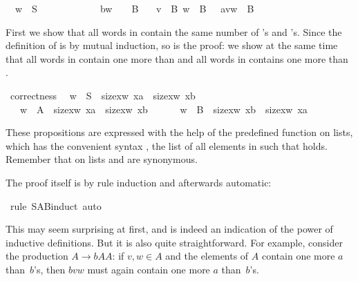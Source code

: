 \begin{isabellebody}
\isanewline
\ \ {\isachardoublequote}w\ {\isasymin}\ S\ \ \ \ \ \ \ \ \ \ \ \ {\isasymLongrightarrow}\ b{\isacharhash}w\ \ \ {\isasymin}\ B{\isachardoublequote}\isanewline
\ \ {\isachardoublequote}{\isasymlbrakk}\ v\ {\isasymin}\ B{\isacharsemicolon}\ w\ {\isasymin}\ B\ {\isasymrbrakk}\ {\isasymLongrightarrow}\ a{\isacharhash}v{\isacharat}w\ {\isasymin}\ B{\isachardoublequote}%
\begin{isamarkuptext}%
\noindent
First we show that all words in  contain the same number of 's and 's. Since the definition of  is by mutual
induction, so is the proof: we show at the same time that all words in
 contain one more  than  and all words in  contains one more  than .%
\end{isamarkuptext}%
\ correctness{\isacharcolon}\isanewline
\ \ {\isachardoublequote}{\isacharparenleft}w\ {\isasymin}\ S\ {\isasymlongrightarrow}\ size{\isacharbrackleft}x{\isasymin}w{\isachardot}\ x{\isacharequal}a{\isacharbrackright}\ {\isacharequal}\ size{\isacharbrackleft}x{\isasymin}w{\isachardot}\ x{\isacharequal}b{\isacharbrackright}{\isacharparenright}\ \ \ \ \ {\isasymand}\isanewline
\ \ \ {\isacharparenleft}w\ {\isasymin}\ A\ {\isasymlongrightarrow}\ size{\isacharbrackleft}x{\isasymin}w{\isachardot}\ x{\isacharequal}a{\isacharbrackright}\ {\isacharequal}\ size{\isacharbrackleft}x{\isasymin}w{\isachardot}\ x{\isacharequal}b{\isacharbrackright}\ {\isacharplus}\ {}{\isacharparenright}\ {\isasymand}\isanewline
\ \ \ {\isacharparenleft}w\ {\isasymin}\ B\ {\isasymlongrightarrow}\ size{\isacharbrackleft}x{\isasymin}w{\isachardot}\ x{\isacharequal}b{\isacharbrackright}\ {\isacharequal}\ size{\isacharbrackleft}x{\isasymin}w{\isachardot}\ x{\isacharequal}a{\isacharbrackright}\ {\isacharplus}\ {}{\isacharparenright}{\isachardoublequote}%
\begin{isamarkuptxt}%
\noindent
These propositions are expressed with the help of the predefined  function on lists, which has the convenient syntax , the list of all elements  in  such that 
holds. Remember that on lists  and  are synonymous.

The proof itself is by rule induction and afterwards automatic:%
\end{isamarkuptxt}%
\ {\isacharparenleft}rule\ S{\isacharunderscore}A{\isacharunderscore}B{\isachardot}induct{\isacharcomma}\ auto{\isacharparenright}%
\begin{isamarkuptext}%
\noindent
This may seem surprising at first, and is indeed an indication of the power
of inductive definitions. But it is also quite straightforward. For example,
consider the production $A \to b A A$: if $v,w \in A$ and the elements of $A$
contain one more $a$ than~$b$'s, then $bvw$ must again contain one more $a$
than~$b$'s.


\end{isamarkuptext}
\end{isabellebody}
